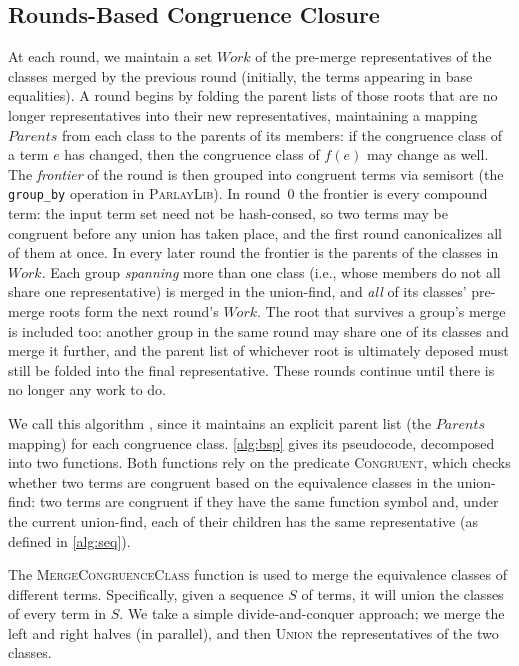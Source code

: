 \subsection{Rounds-Based Congruence Closure}
\label{subsec:rounds}

At each round, we maintain a set $\mathit{Work}$ of the pre-merge
representatives of the classes merged by the previous round (initially, the
terms appearing in base equalities). A round begins by folding the parent
lists of those roots that are no longer representatives into their new
representatives, maintaining a mapping $\mathit{Parents}$ from each class to
the parents of its members: if the congruence class of a term $e$ has
changed, then the congruence class of $f(e)$ may change as well. The
\emph{frontier} of the round is then grouped into congruent terms via
semisort (the \texttt{group\_by} operation in \textsc{ParlayLib}). In
round~0 the frontier is every compound term: the input term set need not be
hash-consed, so two terms may be congruent before any union has taken place,
and the first round canonicalizes all of them at once. In every later round
the frontier is the parents of the classes in $\mathit{Work}$. Each group
\emph{spanning} more than one class (i.e., whose members do not all share one
representative) is merged in the union-find, and \emph{all} of its classes'
pre-merge roots form the next round's $\mathit{Work}$. The root that survives
a group's merge is included too: another group in the same round may share
one of its classes and merge it further, and the parent list of whichever
root is ultimately deposed must still be folded into the final
representative. These rounds continue until there is no longer any work to
do.

We call this algorithm \parentalgo, since it maintains an explicit parent list
(the $\mathit{Parents}$ mapping) for each congruence class.
\autoref{alg:bsp} gives its pseudocode, decomposed into two functions.
Both functions rely on the predicate \textsc{Congruent}, which checks whether
two terms are congruent based on the equivalence classes in the union-find:
two terms are congruent if they have the same function symbol and, under the
current union-find, each of their children has the same representative (as
defined in \autoref{alg:seq}).

The \textsc{MergeCongruenceClass} function is used to merge the equivalence
classes of different terms. Specifically, given a sequence $S$ of terms, it will
union the classes of every term in $S$. We take a simple divide-and-conquer
approach; we merge the left and right halves (in parallel), and then
\textsc{Union} the representatives of the two classes.

